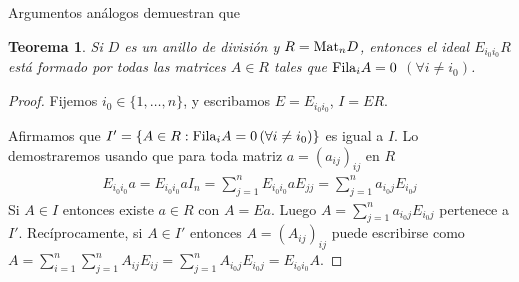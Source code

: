 \documentclass{report}
\newcommand{\Mat}{\textnormal{Mat}}
\newcommand{\Fila}{\textnormal{Fila}}
\newtheorem{theorem}{Teorema}
\begin{document}
  Argumentos análogos demuestran que
  \begin{theorem}
    Si \(D\) es un anillo de división y \(R = \Mat_n D\), entonces el ideal \(E_{i_0 i_0} R\) está formado por todas las matrices \(A \in R\) tales que \(\Fila_i A = 0\) \((\forall i \neq i_0)\).
  \end{theorem}
  \begin{proof}
    Fijemos \(i_0 \in \{1, \dots, n\}\), y escribamos \(E = E_{i_0 i_0}\), \(I = E R\).

    Afirmamos que \(I' = \{A \in R : \Fila_i A = 0 \, (\forall i \neq i_0)\}\) es igual a \(I\).
    Lo demostraremos usando que para toda matriz \(a = (a_{i j})_{i j}\) en \(R\)
    \begin{align}
      E_{i_0 i_0} a
      =
      E_{i_0 i_0} a I_n
      =
      \sum_{j = 1}^n E_{i_0 i_0} a E_{j j}
      =
      \sum_{j = 1}^n a_{i_0 j} E_{i_0 j}
    \end{align}
    Si \(A \in I\) entonces existe \(a \in R\) con \(A = E a\).
    Luego \(A = \sum_{j = 1}^n a_{i_0 j} E_{i_0 j}\) pertenece a \(I'\).
    Recíprocamente, si \(A \in I'\) entonces \(A = (A_{i j})_{i j}\) puede escribirse como \(A = \sum_{i = 1}^n \sum_{j = 1}^n A_{i j} E_{i j} = \sum_{j = 1}^n A_{i_0 j} E_{i_0 j} = E_{i_0 i_0} A\).
  \end{proof}
\end{document}
